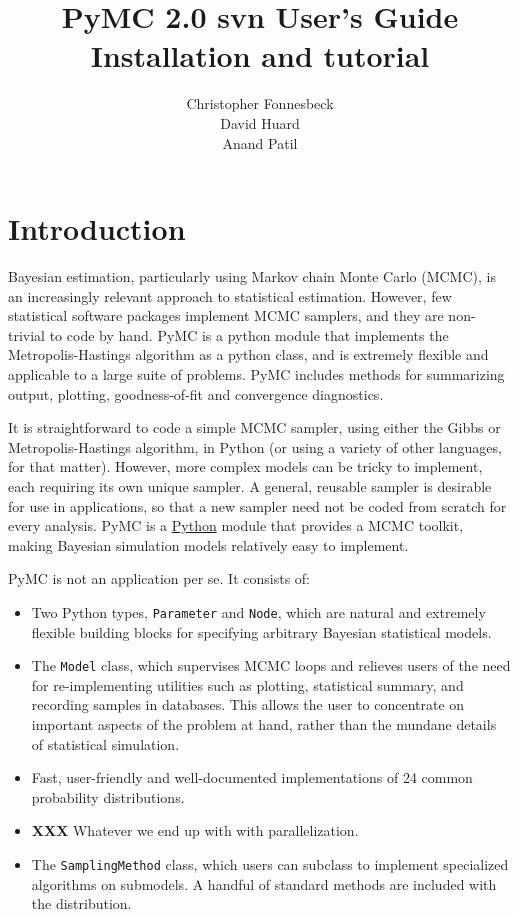 \documentclass[]{book}
\title{PyMC 2.0 svn User's Guide \\
Installation and tutorial}
\author{ Christopher Fonnesbeck\\ David Huard \\ Anand Patil }
\begin{document}
\ifpdf
{}
\else
{}
\fi

\maketitle

\tableofcontents

\chapter{Introduction} %

Bayesian estimation, particularly using Markov chain Monte Carlo (MCMC), is an increasingly relevant approach to statistical estimation. However, few statistical software packages implement MCMC samplers, and they are non-trivial to code by hand. PyMC is a python module that implements the Metropolis-Hastings algorithm as a python class, and is extremely flexible and applicable to a large suite of problems. PyMC includes methods for summarizing output, plotting, goodness-of-fit and convergence diagnostics.

It is straightforward to code a simple MCMC sampler, using either the Gibbs or Metropolis-Hastings algorithm, in Python (or using a variety of other languages, for that matter). However, more complex models can be tricky to implement, each requiring its own unique sampler. A general, reusable sampler is desirable for use in applications, so that a new sampler need not be coded from scratch for every analysis. PyMC is a \href{http://python.org}{Python} module that provides a MCMC toolkit, making Bayesian simulation models relatively easy to implement.

\bigskip
PyMC is not an application per se. It consists of:
\begin{itemize}
    \item Two Python types, \texttt{Parameter} and \texttt{Node}, which are natural and extremely flexible building blocks for specifying arbitrary Bayesian statistical models.
    \item The \texttt{Model} class, which supervises MCMC loops and relieves users of the need for re-implementing utilities such as plotting, statistical summary, and recording samples in databases. This allows the user to concentrate on important aspects of the problem at hand, rather than the mundane details of statistical simulation.
    \item Fast, user-friendly and well-documented implementations of 24 common probability distributions.
    \item \textbf{XXX} Whatever we end up with with parallelization.
    \item The \texttt{SamplingMethod} class, which users can subclass to implement specialized algorithms on submodels. A handful of standard methods are included with the distribution.
\end{itemize}
\end{document}
